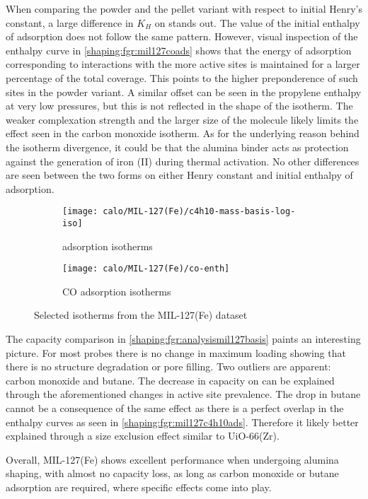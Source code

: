 When comparing the powder and the pellet variant with respect to
initial Henry's constant, a large difference in \(K_H\) on 
stands out. The value of the initial enthalpy of adsorption
does not follow the same pattern.
However, visual inspection of the enthalpy curve in
\autoref{shaping:fgr:mil127coads} shows that the energy of
adsorption corresponding to
interactions with the more active sites is maintained for a larger
percentage of the total coverage.
This points to the higher preponderence of such sites in the powder
variant. A similar offset can be seen in the propylene enthalpy at very
low pressures, but this is not reflected in the shape of the isotherm.
The weaker complexation strength and the larger size of the molecule
likely limits the effect seen in the carbon monoxide isotherm.
As for the underlying reason behind the isotherm divergence, it
could be that the alumina binder acts as protection against the
generation of iron (II) during thermal activation.
No other differences are seen between the two forms on either Henry
constant and initial enthalpy of adsorption.

\begin{figure}[!htb]
	\centering
	\begin{subfigure}{0.45\textwidth}
		\texttt{[image: calo/MIL-127(Fe)/c4h10-mass-basis-log-iso]}
		\caption{ adsorption isotherms}%
		\label{shaping:fgr:mil127c4h10ads}
	\end{subfigure}%
	\begin{subfigure}{0.45\textwidth}
		\texttt{[image: calo/MIL-127(Fe)/co-enth]}
		\caption{CO adsorption isotherms}%
		\label{shaping:fgr:mil127coads}
	\end{subfigure}%
	\caption{Selected isotherms from the MIL-127(Fe) dataset}%
	\label{shaping:fgr:mil127isotherms}
\end{figure}

The capacity comparison in \autoref{shaping:fgr:analysismil127basis}
paints an interesting picture. For most probes there is no change in
maximum loading showing that there is no structure degradation or
pore filling. Two outliers are apparent: carbon monoxide and
butane. The decrease in capacity on  can be explained through the
aforementioned changes in active site prevalence.
The drop in butane cannot be a consequence of the same effect
as there is a perfect overlap in the enthalpy curves as seen in
\autoref{shaping:fgr:mil127c4h10ads}.
Therefore it likely better explained through a size exclusion
effect similar to UiO-66(Zr).

Overall, MIL-127(Fe) shows excellent performance when undergoing
alumina shaping, with almost no capacity loss, as long as
carbon monoxide or butane adsorption are required, where specific effects
come into play.
